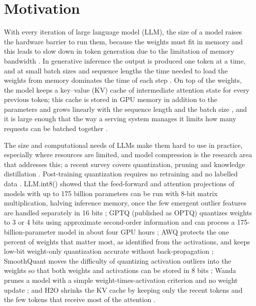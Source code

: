 \documentclass[
11pt, %
english, %
singlespacing, %
headsepline, %
]{MastersDoctoralThesis} %
\begin{document}
\section{Motivation}
\label{sec:ch1-motivation}

With every iteration of large language model (LLM), the size of a model raises the hardware barrier to run them, because the weights must fit in memory and this leads to slow down in token generation due to the limitation of memory bandwidth \cite{lin2024awq}. In generative inference the output is produced one token at a time, and at small batch sizes and sequence lengths the time needed to load the weights from memory dominates the time of each step \cite{pope2023efficiently}. On top of the weights, the model keeps a key--value (KV) cache of intermediate attention state for every previous token; this cache is stored in GPU memory in addition to the parameters and grows linearly with the sequence length and the batch size \cite{zhang2023h2o}, and it is large enough that the way a serving system manages it limits how many requests can be batched together \cite{kwon2023vllm}.

The size and computational needs of LLMs make them hard to use in practice, especially where resources are limited, and model compression is the research area that addresses this; a recent survey covers quantization, pruning and knowledge distillation \cite{zhu2024survey}. Post-training quantization requires no retraining and no labelled data \cite{nagel2021whitepaper}. LLM.int8() showed that the feed-forward and attention projections of models with up to 175 billion parameters can be run with 8-bit matrix multiplication, halving inference memory, once the few emergent outlier features are handled separately in 16 bits \cite{dettmers2022llmint8}; GPTQ (published as OPTQ) quantizes weights to 3 or 4 bits using approximate second-order information and can process a 175-billion-parameter model in about four GPU hours \cite{frantar2023gptq}; AWQ protects the one percent of weights that matter most, as identified from the activations, and keeps low-bit weight-only quantization accurate without back-propagation \cite{lin2024awq}; SmoothQuant moves the difficulty of quantizing activation outliers into the weights so that both weights and activations can be stored in 8 bits \cite{xiao2023smoothquant}; Wanda prunes a model with a simple weight-times-activation criterion and no weight update \cite{sun2024wanda}; and H2O shrinks the KV cache by keeping only the recent tokens and the few tokens that receive most of the attention \cite{zhang2023h2o}.
\end{document}
